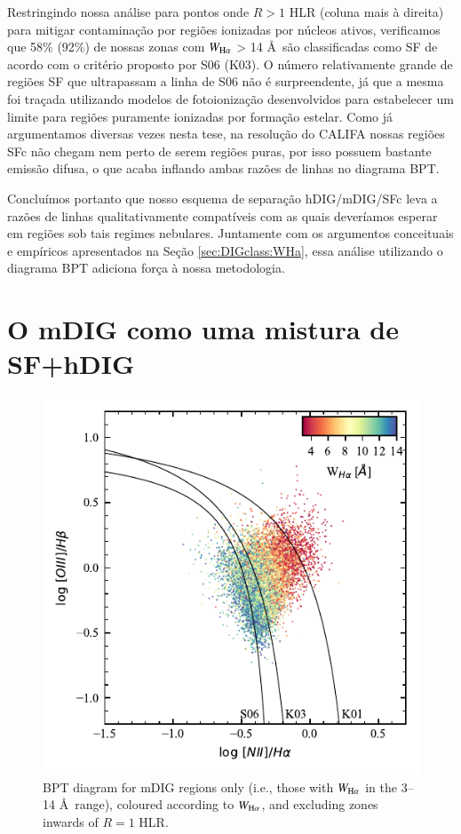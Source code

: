 Restringindo nossa análise para pontos onde $R > 1$ HLR (coluna mais à direita) para mitigar contaminação por regiões ionizadas por núcleos ativos, verificamos que 58\% (92\%) de nossas zonas com $W_{\Ha}$ > 14 \AA\ são classificadas como SF de acordo com o critério proposto por S06 (K03). O número relativamente grande de regiões SF que ultrapassam a linha de S06 não é surpreendente, já que a mesma foi traçada utilizando modelos de fotoionização desenvolvidos para estabelecer um limite para regiões puramente ionizadas por formação estelar. Como já argumentamos diversas vezes nesta tese, na resolução do CALIFA nossas regiões SFc não chegam nem perto de serem regiões \hii puras, por isso possuem bastante emissão difusa, o que acaba inflando ambas razões de linhas no diagrama BPT.

Concluímos portanto que nosso esquema de separação hDIG/mDIG/SFc leva a razões de linhas qualitativamente compatíveis com as quais deveríamos esperar em regiões sob tais regimes nebulares. Juntamente com os argumentos conceituais e empíricos apresentados na Seção \ref{sec:DIGclass:WHa}, essa análise utilizando o diagrama BPT adiciona força à nossa metodologia.


\section{O mDIG como uma mistura de SF+hDIG}
\label{sec:DIGdisc:mDIG}

\begin{figure}
 \includegraphics{figuras/fig_BPT_mixed.pdf}
 \caption{BPT diagram for mDIG regions only (i.e., those with $W_{\Ha}$ in the 3--14 \AA\ range), coloured according to $W_{\Ha}$, and excluding zones inwards of $R = 1$ HLR.}
 \label{fig:BPT_mDIG}
\end{figure}

